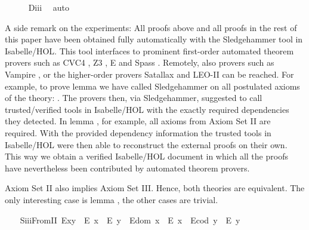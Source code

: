 \begin{isabellebody}
%
\isadelimproof
\ \ \ \ %
\endisadelimproof
%
\isatagproof
{}\isamarkupfalse%
\ D\isactrlsub i\isactrlsub i\isactrlsub i\ \isamarkupfalse%
\ auto%
\endisatagproof
{\isafoldproof}%
%
\isadelimproof
%
\endisadelimproof
%
\begin{isamarkuptext}%
A side remark on the experiments: All proofs above and all proofs in the rest of this paper 
 have been obtained fully automatically with the Sledgehammer tool in Isabelle/HOL. This
 tool interfaces to prominent first-order automated theorem provers such as CVC4 \cite{CVC4}, 
 Z3 \cite{Z3}, E \cite{E} and Spass \cite{Spass}. 
 Remotely, also provers such as Vampire \cite{Vampire}, or the higher-order provers 
 Satallax \cite{Satallax} and LEO-II \cite{LEO} 
 can be reached. For example, to prove lemma  we have called Sledgehammer on all 
 postulated axioms of the theory: .  
 The provers then, via Sledgehammer, suggested to call trusted/verified tools in Isabelle/HOL
 with the exactly required dependencies they detected. In lemma , for 
 example, all  axioms from Axiom Set II are required. With the provided dependency information 
 the trusted tools in Isabelle/HOL were then able to reconstruct the external proofs on their own.
 This way we obtain a verified Isabelle/HOL document in which all the proofs have nevertheless been contributed
 by automated theorem provers.%
\end{isamarkuptext}\isamarkuptrue%
%
\begin{isamarkuptext}%
Axiom Set II also implies Axiom Set III. Hence, both theories are
 equivalent. The only interesting case is lemma , the other cases are 
 trivial.%
\end{isamarkuptext}\isamarkuptrue%
\isanewline
\ \ \isamarkupfalse%
\ S\isactrlsub i\isactrlsub i\isactrlsub iFromII{\isacharcolon}\ {\isachardoublequoteopen}{\isacharparenleft}E{\isacharparenleft}x{\isasymcdot}y{\isacharparenright}\ \isactrlbold {\isasymrightarrow}\ {\isacharparenleft}E\ x\ \isactrlbold {\isasymand}\ E\ y{\isacharparenright}{\isacharparenright}\ \isactrlbold {\isasymand}\ {\isacharparenleft}E{\isacharparenleft}dom\ x{\isacharparenright}\ \isactrlbold {\isasymrightarrow}\ E\ x{\isacharparenright}\ \isactrlbold {\isasymand}\ {\isacharparenleft}E{\isacharparenleft}cod\ y{\isacharparenright}\ \isactrlbold {\isasymrightarrow}\ E\ y{\isacharparenright}{\isachardoublequoteclose}\ \ \isanewline

\end{isabellebody}
